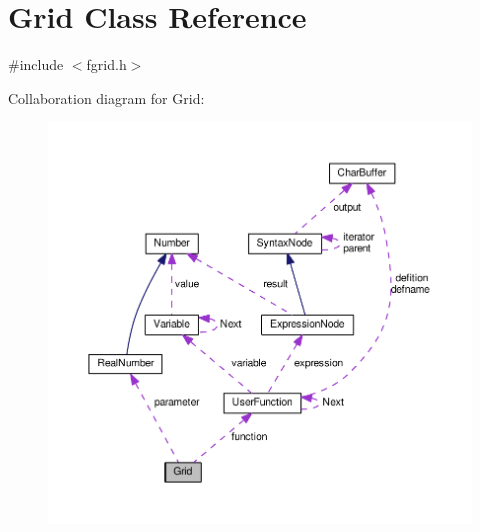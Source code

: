 \hypertarget{classGrid}{}\section{Grid Class Reference}
\label{classGrid}


{\ttfamily \#include $<$fgrid.\+h$>$}



Collaboration diagram for Grid\+:\nopagebreak
\begin{figure}[H]
\begin{center}
\leavevmode
\includegraphics[width=350pt]{classGrid__coll__graph}
\end{center}
\end{figure}
